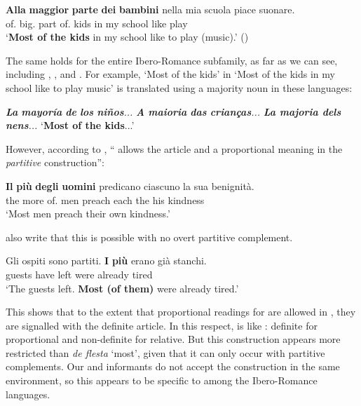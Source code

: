 \documentclass[output=paper
,modfonts
,nonflat]{langsci/langscibook}
\begin{document}
\ea \label{ex:coppockstrand:74} 
\gll \textbf{Alla} \textbf{maggior} \textbf{parte} \textbf{dei} \textbf{bambini} nella mia scuola piace suonare.\\
of. big.\cmpr{} part of. kids in my school like play\\ 
\glt `\textbf{Most of the kids} in my school like to play (music).' \hfill ()
\z

The same holds for the entire Ibero-Romance subfamily, as far as we can see, including , , and . For example,  `Most of the kids' in `Most of the kids in my school like to play music' is translated using a majority noun in these languages:

\ea  \label{ex:coppockstrand:75}
\settowidth{}
\ea \textit{\textbf{La} \textbf{mayoría} \textbf{de} \textbf{los} \textbf{niños}...} 
\ex \textit{\textbf{A} \textbf{maioria} \textbf{das} \textbf{crianças}...} 
\ex \textit{\textbf{La majoria dels nens}...} 
\sn `\textbf{Most of the kids}...'
\z
\z

However, according to \citet[20]{Dobrovie-SorinGiurgea2015}, `` allows the article and a proportional meaning in the \textit{partitive} construction'':

\ea \label{ex:coppockstrand:76}
\gll \textbf{Il} \textbf{pi\`u} \textbf{degli} \textbf{uomini} predicano ciascuno la sua benignit\`a.\\
the more of. men preach each the his kindness\\ 
\glt `Most men preach their own kindness.'
\z

\citet[21]{Dobrovie-SorinGiurgea2015} also write that this is possible with no overt partitive complement.

\ea \label{ex:coppockstrand:77}
\gll Gli ospiti sono partiti. \textbf{I} \textbf{pi\`u} erano gi\`a stanchi.\\
 guests have left  \cmpr{} were already tired\\ 
\glt `The guests left. \textbf{Most (of them)} were already tired.'
\z

This shows that to the extent that proportional readings for  are allowed in , they are signalled with the definite article. In this respect,  is like : definite for proportional and non-definite for relative. But this construction appears more restricted than  \textit{de flesta} `most', given that it can only occur with partitive complements. Our  and  informants do not accept the  construction in the same environment, so this appears to be specific to  among the Ibero-Romance languages.
\end{document}
